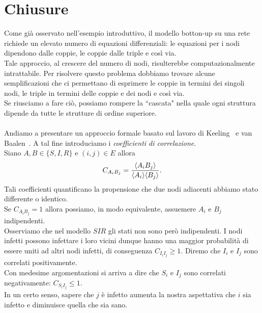 \section{Chiusure}
Come gi\`a osservato nell'esempio introduttivo, il modello botton-up su una rete richiede un elevato numero di equazioni differenziali: le equazioni per i nodi dipendono dalle coppie, le coppie dalle triple e cos\`i via.\\
Tale approccio, al crescere del numero di nodi, risulterebbe computazionalmente intrattabile. Per risolvere questo problema dobbiamo trovare alcune semplificazioni che ci permettano di esprimere le coppie in termini dei singoli nodi, le triple in termini delle coppie e dei nodi e cos\`i via.\\
Se riusciamo a fare ci\`o, possiamo rompere la ``cascata" nella quale ogni struttura dipende da tutte le strutture di ordine superiore.\\ \\
Andiamo a presentare un approccio formale basato sul lavoro di Keeling~\cite{keeling1995ecology}  e van Baalen~\cite{van2000pair}.  A tal fine introduciamo i  \textit{coefficienti di correlazione}.\\
Siano $A, B\in \{ S, I,R\}$ e $(i,j)\in E$ allora 
$$C_{A_i B_j} = \frac{\langle A_i B_j \rangle}{\langle A_i \rangle \langle B_j \rangle}.$$
Tali coefficienti quantificano la propensione che due nodi adiacenti abbiamo stato differente o identico.\\
Se $C_{A_iB_j}=1$ allora possiamo, in modo equivalente, assuemere  $A_i$ e $B_j$ indipendenti.\\
Osserviamo che nel modello $SIR$ gli stati non sono per\`o indipendenti. I nodi infetti possono infettare i loro vicini dunque hanno una maggior probabilit\`a di essere uniti ad altri nodi infetti,  di conseguenza  $C_{I_i I_j}\geq 1$.  Diremo che $I_i$ e $I_j$ sono correlati positivamente.\\
Con medesime argomentazioni si arriva a dire che $S_i$ e $I_j$ sono correlati negativamente: $C_{S_i I_j}\leq 1$.\\
 In un certo senso, sapere che $j$ \`e infetto aumenta la nostra aspettativa  che $i$ sia infetto e diminuisce quella che sia sano.\\
  
